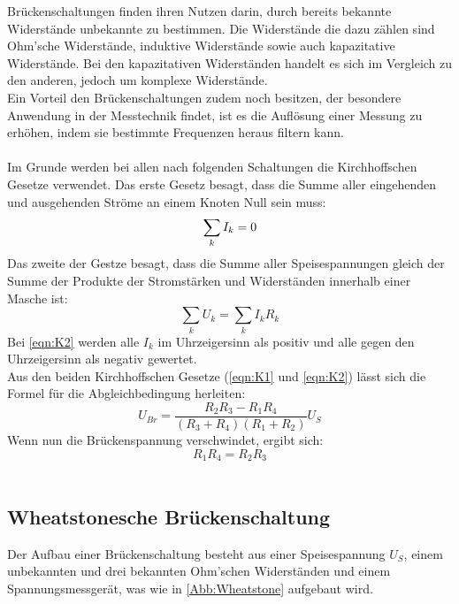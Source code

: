 \documentclass[
  bibliography=totoc,     %
  captions=tableheading,  %
  titlepage=firstiscover, %
]{scrartcl}
\begin{document}
  Brückenschaltungen finden ihren Nutzen darin, durch bereits bekannte Widerstände unbekannte zu bestimmen.
  Die Widerstände die dazu zählen sind Ohm'sche Widerstände, induktive Widerstände sowie auch kapazitative Widerstände. 
  Bei den kapazitativen Widerständen handelt es sich im Vergleich zu den anderen, jedoch um komplexe Widerstände. \\
  Ein Vorteil den Brückenschaltungen zudem noch besitzen, der besondere Anwendung in der Messtechnik findet, ist es die 
  Auflösung einer Messung zu erhöhen, indem sie bestimmte Frequenzen heraus filtern kann.\\\\
  Im Grunde werden bei allen nach folgenden Schaltungen die Kirchhoffschen Gesetze verwendet. Das erste Gesetz besagt,
  dass die Summe aller eingehenden und ausgehenden Ströme an einem Knoten Null sein muss:
  \begin{equation}
    \sum_k I_k = 0 \\ \label{eqn:K1}
  \end{equation}
  Das zweite der Gestze besagt, dass die Summe aller Speisespannungen gleich der Summe der Produkte der Stromstärken und 
  Widerständen innerhalb einer Masche ist:
  \begin{equation}
    \sum_k U_k = \sum_k I_k R_k \label{eqn:K2}
  \end{equation}
  Bei \autoref{eqn:K2} werden alle $I_k$ im Uhrzeigersinn als positiv und alle gegen den Uhrzeigersinn als negativ gewertet. \\
  Aus den beiden Kirchhoffschen Gesetze (\autoref{eqn:K1} und \autoref{eqn:K2}) lässt sich die Formel für die Abgleichbedingung
  herleiten:
  \begin{equation}
    U_{Br} = \frac{R_2 R_3 - R_1 R_4}{(R_3 + R_4)(R_1 + R_2)} U_S
  \end{equation}
  Wenn nun die Brückenspannung verschwindet, ergibt sich:
  \begin{equation}
    R_1 R_4 = R_2 R_3 \label{eqn:Abgl}
  \end{equation}
  \\

  \subsection{Wheatstonesche Brückenschaltung}

  Der Aufbau einer Brückenschaltung besteht aus einer Speisespannung $U_S$, einem unbekannten und drei bekannten Ohm'schen 
  Widerständen und einem Spannungsmessgerät, was wie in \autoref{Abb:Wheatstone} aufgebaut wird.
\end{document}
